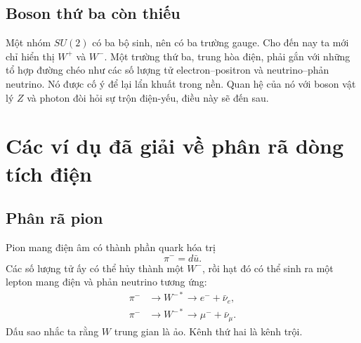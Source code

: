 \begin{classroomqa}
\end{classroomqa}

\subsection{Boson thứ ba còn thiếu}

Một nhóm \(SU(2)\) có ba bộ sinh, nên có ba trường gauge. Cho đến nay ta mới chỉ hiển thị \(W^+\) và \(W^-\). Một trường thứ ba, trung hòa điện, phải gắn với những tổ hợp đường chéo như các số lượng tử electron--positron và neutrino--phản neutrino. Nó được cố ý để lại lẩn khuất trong nền. Quan hệ của nó với boson vật lý \(Z\) và photon đòi hỏi sự trộn điện-yếu, điều này sẽ đến sau.

\begin{classroomqa}
\end{classroomqa}

\section{Các ví dụ đã giải về phân rã dòng tích điện}

\subsection{Phân rã pion}

Pion mang điện âm có thành phần quark hóa trị
\begin{equation}
\pi^-=d\bar u.
\end{equation}
Các số lượng tử ấy có thể hủy thành một \(W^-\), rồi hạt đó có thể sinh ra một lepton mang điện và phản neutrino tương ứng:
\begin{align}
\pi^-&\longrightarrow W^{-*}
\longrightarrow e^-+\bar\nu_e,
\label{eq:l5-pion-electron}\\
\pi^-&\longrightarrow W^{-*}
\longrightarrow \mu^-+\bar\nu_\mu.
\label{eq:l5-pion-muon}
\end{align}
Dấu sao nhắc ta rằng \(W\) trung gian là ảo. Kênh thứ hai là kênh trội.

